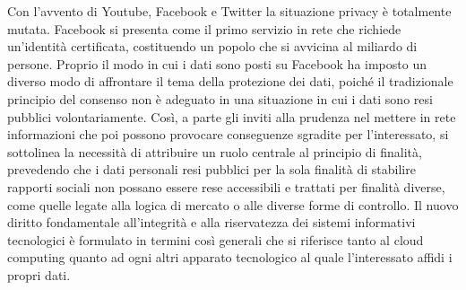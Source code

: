 Con l’avvento di Youtube, Facebook e Twitter la situazione privacy è totalmente mutata. Facebook si presenta come il primo servizio in rete che richiede un’identità certificata, costituendo un popolo che si avvicina al miliardo di persone. Proprio il modo in cui i dati sono posti su Facebook ha imposto un diverso modo di affrontare il tema della protezione dei dati, poiché il tradizionale principio del consenso non è adeguato in una situazione in cui i dati sono resi pubblici volontariamente. Così, a parte gli inviti alla prudenza nel mettere in rete informazioni che poi possono provocare conseguenze sgradite per l’interessato, si sottolinea la necessità di attribuire un ruolo centrale al principio di finalità, prevedendo che i dati personali resi pubblici per la sola finalità di stabilire rapporti sociali non possano essere rese accessibili e trattati per finalità diverse, come quelle legate alla logica di mercato o alle diverse forme di controllo.
Il nuovo diritto fondamentale all’integrità e alla riservatezza dei sistemi informativi tecnologici è formulato in termini così generali che si riferisce tanto al cloud computing quanto ad ogni altri apparato tecnologico al quale l’interessato affidi i propri dati.

